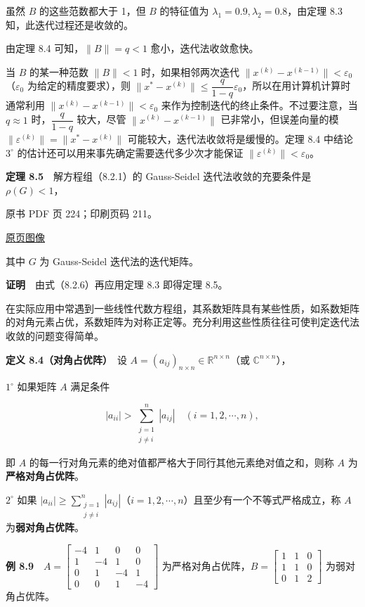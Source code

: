 虽然 \(B\) 的这些范数都大于 1，但 \(B\) 的特征值为 \(\lambda_1=0.9,\lambda_2=0.8\)，由定理 8.3 知，此迭代过程还是收敛的。

由定理 8.4 可知，\(\|B\|=q<1\) 愈小，迭代法收敛愈快。

当 \(B\) 的某一种范数 \(\|B\|<1\) 时，如果相邻两次迭代 \(\|x^{(k)}-x^{(k-1)}\|<\varepsilon_0\)（\(\varepsilon_0\) 为给定的精度要求），则 \(\|x^*-x^{(k)}\|\leqslant\dfrac{q}{1-q}\varepsilon_0\)，所以在用计算机计算时通常利用 \(\|x^{(k)}-x^{(k-1)}\|<\varepsilon_0\) 来作为控制迭代的终止条件。不过要注意，当 \(q\approx1\) 时，\(\dfrac{q}{1-q}\) 较大，尽管 \(\|x^{(k)}-x^{(k-1)}\|\) 已非常小，但误差向量的模 \(\|\varepsilon^{(k)}\|=\|x^*-x^{(k)}\|\) 可能较大，迭代法收敛将是缓慢的。定理 8.4 中结论 \(3^\circ\) 的估计还可以用来事先确定需要迭代多少次才能保证 \(\|\varepsilon^{(k)}\|<\varepsilon_0\)。

\textbf{定理 8.5}　解方程组（8.2.1）的 Gauss-Seidel 迭代法收敛的充要条件是 \(\rho(G)<1\)，

\clearpage

原书 PDF 页 224；印刷页码 211。

\href{source-images/pdf-224.jpeg}{原页图像}

其中 \(G\) 为 Gauss-Seidel 迭代法的迭代矩阵。

\textbf{证明}　由式（8.2.6）再应用定理 8.3 即得定理 8.5。

在实际应用中常遇到一些线性代数方程组，其系数矩阵具有某些性质，如系数矩阵的对角元素占优，系数矩阵为对称正定等。充分利用这些性质往往可使判定迭代法收敛的问题变得简单。

\textbf{定义 8.4（对角占优阵）}　设 \(A=(a_{ij})_{n\times n}\in\mathbb R^{n\times n}\)（或 \(\mathbb C^{n\times n}\)），

\(1^\circ\) 如果矩阵 \(A\) 满足条件

\[
|a_{ii}|>\sum_{\substack{j=1\\j\neq i}}^n|a_{ij}|\quad(i=1,2,\cdots,n),
\tag{8.3.7}
\]

即 \(A\) 的每一行对角元素的绝对值都严格大于同行其他元素绝对值之和，则称 \(A\) 为\textbf{严格对角占优阵}。

\(2^\circ\) 如果 \(|a_{ii}|\geqslant\sum\limits_{\substack{j=1\\j\neq i}}^n|a_{ij}|\)（\(i=1,2,\cdots,n\)）且至少有一个不等式严格成立，称 \(A\) 为\textbf{弱对角占优阵}。

\textbf{例 8.9}　\(A=\begin{bmatrix}-4&1&0&0\\1&-4&1&0\\0&1&-4&1\\0&0&1&-4\end{bmatrix}\) 为严格对角占优阵，\(B=\begin{bmatrix}1&1&0\\1&1&0\\0&1&2\end{bmatrix}\) 为弱对角占优阵。

